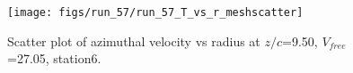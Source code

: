 \begin{figure}[H]
\centering
\texttt{[image: figs/run\_57/run\_57\_T\_vs\_r\_meshscatter]}
\caption{Scatter plot of azimuthal velocity vs radius at $z/c$=9.50, $V_{free}$=27.05, station6.}
\end{figure}


